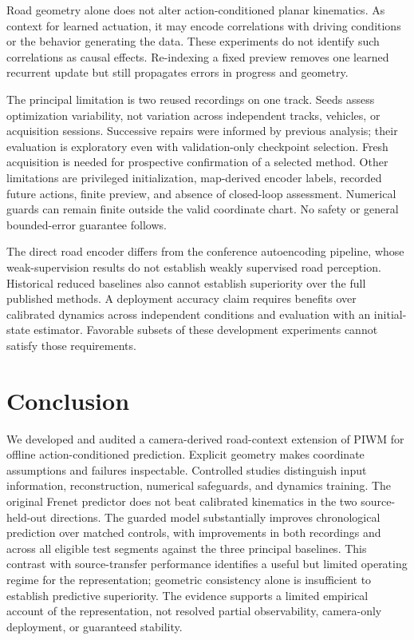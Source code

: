 \documentclass[preprint,12pt]{elsarticle}
\begin{document}
Road geometry alone does not alter action-conditioned planar kinematics. As
context for learned actuation, it may encode correlations with driving conditions
or the behavior generating the data. These experiments do not identify such
correlations as causal effects. Re-indexing a fixed preview removes one learned
recurrent update but still propagates errors in progress and geometry.

The principal limitation is two reused recordings on one track. Seeds assess
optimization variability, not variation across independent tracks, vehicles,
or acquisition sessions. Successive repairs were informed by previous analysis;
their evaluation is exploratory even with validation-only checkpoint selection.
Fresh acquisition is needed for prospective confirmation of a selected method.
Other limitations are privileged initialization, map-derived encoder labels, recorded
future actions, finite preview, and absence of closed-loop assessment. Numerical
guards can remain finite outside the valid coordinate chart. No safety or
general bounded-error guarantee follows.

The direct road encoder differs from the conference autoencoding pipeline, whose
weak-supervision results do not establish weakly supervised road perception.
Historical reduced baselines also cannot establish superiority over the full
published methods. A deployment accuracy claim requires benefits over calibrated
dynamics across independent conditions and evaluation with an initial-state
estimator. Favorable subsets of these development experiments cannot satisfy
those requirements.

\section{Conclusion}\label{sec:conclusion}
We developed and audited a camera-derived road-context extension of PIWM for
offline action-conditioned prediction. Explicit geometry makes coordinate
assumptions and failures inspectable. Controlled studies distinguish input
information, reconstruction, numerical safeguards, and dynamics training.
The original Frenet predictor does not beat calibrated kinematics in the two
source-held-out directions. The guarded model substantially improves chronological prediction
over matched controls, with improvements in both recordings and across all
eligible test segments against the three principal baselines. This contrast
with source-transfer performance identifies a useful but limited operating
regime for the representation; geometric consistency alone is insufficient
to establish predictive superiority.
The evidence supports a limited empirical account of the representation, not
resolved partial observability, camera-only deployment, or guaranteed stability.
\end{document}
